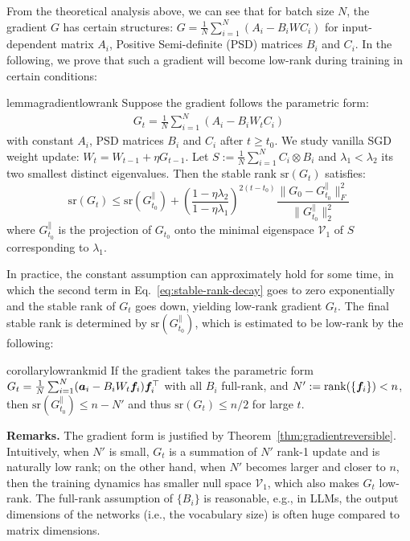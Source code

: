 \def\dd{\mathrm{d}}
\def\gzeroproj{G_{t_0}^\parallel}
\def\cV{\mathcal{V}}

From the theoretical analysis above, we can see that for batch size $N$, the gradient $G$ has certain structures: $G = \frac{1}{N}\sum_{i=1}^N (A_i - B_i W C_i)$ for input-dependent matrix $A_i$, Positive Semi-definite (PSD) matrices $B_i$ and $C_i$. In the following, we prove that such a gradient will become low-rank during training in certain conditions:

\def\sr{\mathrm{sr}}

\begin{restatable}{lemma}{gradientlowrank}
\label{lemma:gradientlowrank}
    Suppose the gradient follows the parametric form: 
    \begin{eqnarray}
          G_t=\frac{1}{N}\sum_{i=1}^N (A_i-B_i W_t C_i)\label{eq:constantgradientcoeff}
    \end{eqnarray} 
    with constant $A_i$, PSD matrices $B_i$ and $C_i$ after $t \ge t_0$. We study vanilla SGD weight update: $W_t=W_{t-1}+\eta G_{t-1}$. Let $S := \frac{1}{N}\sum_{i=1}^N C_i \otimes B_i$ and $\lambda_1 < \lambda_2$ its two smallest distinct eigenvalues. Then the stable rank $\sr(G_t)$ satisfies:
    \begin{equation}
        \sr(G_t) \le \sr(\gzeroproj)\!+\!\left(\frac{1\!-\!\eta \lambda_2}{1\!-\!\eta \lambda_1}\right)^{2(t-t_0)} \frac{\|G_0\!-\!\gzeroproj\|_F^2}{\|\gzeroproj\|_2^2} \label{eq:stable-rank-decay}
    \end{equation}
    where $\gzeroproj$ is the projection of $G_{t_0}$ onto the minimal eigenspace $\cV_1$ of $S$ corresponding to $\lambda_1$.
\end{restatable}
In practice, the constant assumption can approximately hold for some time, in which the second term in Eq.~\ref{eq:stable-rank-decay} goes to zero exponentially and the stable rank of $G_t$ goes down, yielding low-rank gradient $G_t$. The final stable rank is determined by $\sr(\gzeroproj)$, which is estimated to be low-rank by the following: 
\begin{restatable}{corollary}{lowrankmid}
\label{co:low-rank-mid}
If the gradient takes the parametric form $G_t = \frac{1}{N}\sum_{i=1}^N ({\bm{a}}_i - B_i W_t {\bm{f}}_i){\bm{f}}_i^\top$ with all $B_i$ full-rank, and $N' := \operatorname{rank}(\{{\bm{f}}_i\}) < n$, then $\sr(\gzeroproj) \le n - N'$ and thus $\sr(G_t) \le n/2$ for large $t$. 
\end{restatable}
\textbf{Remarks.} The gradient form is justified by  Theorem~\ref{thm:gradientreversible}. Intuitively, when $N'$ is small, $G_t$ is a summation of $N'$ rank-1 update and is naturally low rank; on the other hand, when $N'$ becomes larger and closer to $n$, then the training dynamics has smaller null space $\cV_1$, which also makes $G_t$ low-rank. The full-rank assumption of $\{B_i\}$ is reasonable, e.g., in LLMs, the output dimensions of the networks (i.e., the vocabulary size) is often huge compared to matrix dimensions. 

